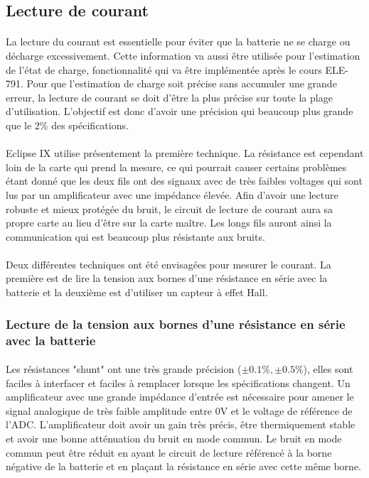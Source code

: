 \subsection{Lecture de courant}
	\paragraph*{}
	La lecture du courant est essentielle pour éviter que la batterie ne se charge ou décharge excessivement. Cette information va aussi être utilisée pour l'estimation de l'état de charge, fonctionnalité qui va être implémentée après le cours ELE-791. Pour que l'estimation de charge soit précise sans accumuler une grande erreur, la lecture de courant se doit d'être la plus précise sur toute la plage d'utilisation. L'objectif est donc d'avoir une précision qui beaucoup plus grande que le 2\% des spécifications. 
	
	\paragraph*{}
	Eclipse IX utilise présentement la première technique. La résistance est cependant loin de la carte qui prend la mesure, ce qui pourrait causer certains problèmes étant donné que les deux fils ont des signaux avec de très faibles voltages qui sont lus par un amplificateur avec une impédance élevée. Afin d'avoir une lecture robuste et mieux protégée du bruit, le circuit de lecture de courant aura sa propre carte au lieu d'être sur la carte maître. Les longs fils auront ainsi la communication qui est beaucoup plus résistante aux bruits. 
	
	\paragraph*{}
	Deux différentes techniques ont été envisagées pour mesurer le courant. La première est de lire la tension aux bornes d'une résistance en série avec la batterie et la deuxième est d'utiliser un capteur à effet Hall. 
	
	
	\subsubsection*{Lecture de la tension aux bornes d'une résistance en série avec la batterie}
	\paragraph*{}
	Les résistances "shunt" ont une très grande précision ($\pm 0.1 \% , \pm 0.5 \%$), elles sont faciles à interfacer et faciles à remplacer lorsque les spécifications changent. Un amplificateur avec une grande impédance d'entrée est nécessaire pour amener le signal analogique de très faible amplitude entre 0V et le voltage de référence de l'ADC. L'amplificateur doit avoir un gain très précis, être thermiquement stable et avoir une bonne atténuation du bruit en mode commun. Le bruit en mode commun peut être réduit en ayant le circuit de lecture référencé à la borne négative de la batterie et en plaçant la résistance en série avec cette même borne.
		
